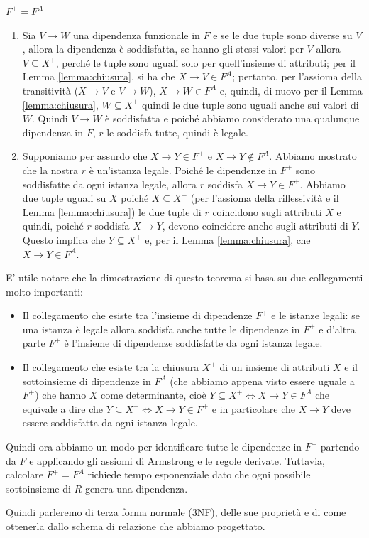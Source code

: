 \begin{Thm}{$F^+=F^A$}{}
\begin{demonstration}
\begin{enumerate}
            \begin{enumerate}[label=(\alph*)]
                \item Sia $V\to W$ una dipendenza funzionale in $F$ e se le due tuple sono diverse su $V$, allora la dipendenza è soddisfatta, se hanno gli stessi valori per $V$ allora $V\subseteq X^+$, perché le tuple sono uguali solo per quell'insieme di attributi; per il Lemma \ref{lemma:chiusura}, si ha che $X\to V\in F^A$; pertanto, per l'assioma della transitività ($X\to V$ e $V\to W$), $X\to W\in F^A$ e, quindi, di nuovo per il Lemma \ref{lemma:chiusura}, $W\subseteq X^+$ quindi le due tuple sono uguali anche sui valori di $W$. Quindi $V\to W$ è soddisfatta e poiché abbiamo considerato una qualunque dipendenza in $F$, $r$ le soddisfa tutte, quindi è legale.

                \item Supponiamo per assurdo che $X\to Y\in F^+$ e $X\to Y\notin F^A$. Abbiamo mostrato che la nostra $r$ è un'istanza legale. Poiché le dipendenze in $F^+$ sono soddisfatte da ogni istanza legale, allora $r$ soddisfa $X\to Y\in F^+$. Abbiamo due tuple uguali su $X$ poiché $X\subseteq X^+$ (per l'assioma della riflessività e il Lemma \ref{lemma:chiusura}) le due tuple di $r$ coincidono sugli attributi $X$ e quindi, poiché $r$ soddisfa $X\to Y$, devono coincidere anche sugli attributi di $Y$. Questo implica che $Y\subseteq X^+$ e, per il Lemma \ref{lemma:chiusura}, che $X\to Y\in F^A$.
            \end{enumerate}
        \end{enumerate}
    \end{demonstration}
    E' utile notare che la dimostrazione di questo teorema si basa su due collegamenti molto importanti: 
    \begin{itemize}
        \item Il collegamento che esiste tra l'insieme di dipendenze $F^+$ e le istanze legali: se una istanza è legale allora soddisfa anche tutte le dipendenze in $F^+$ e d'altra parte $F^+$ è l'insieme di dipendenze soddisfatte da ogni istanza legale.
        \item Il collegamento che esiste tra la chiusura $X^+$ di un insieme di attributi $X$ e il sottoinsieme di dipendenze in $F^A$ (che abbiamo appena visto essere uguale a $F^+$) che hanno $X$ come determinante, cioè $Y\subseteq X^+\iff X\to Y \in F^A$ che equivale a dire che $Y\subseteq X^+ \iff X\to Y \in F^+$ e in particolare che $X\to Y$ deve essere soddisfatta da ogni istanza legale.
    \end{itemize}
\end{Thm}

Quindi ora abbiamo un modo per identificare tutte le dipendenze in $F^+$ partendo da $F$ e applicando gli assiomi di Armstrong e le regole derivate. Tuttavia, calcolare $F^+ = F^A$ richiede tempo esponenziale dato che ogni possibile sottoinsieme di $R$ genera una dipendenza.

Quindi parleremo di terza forma normale (3NF), delle sue proprietà e di come ottenerla dallo schema di relazione che abbiamo progettato.